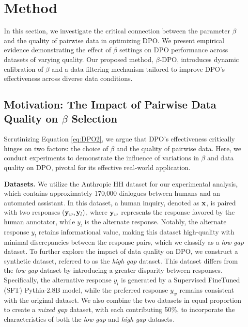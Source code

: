 
\section{Method}
\label{our_work}
In this section, we investigate the critical connection between the parameter $\beta$ and the quality of pairwise data in optimizing DPO. We present empirical evidence demonstrating the effect of $\beta$ settings on DPO performance across datasets of varying quality. Our proposed method, $\beta$-DPO, introduces dynamic calibration of $\beta$ and a data filtering mechanism tailored to improve DPO's effectiveness across diverse data conditions.
\subsection{Motivation: The Impact of Pairwise Data Quality on $\beta$ Selection}
\label{motivation_sec}
Scrutinizing Equation \eqref{eq:DPO2}, we argue that DPO's effectiveness critically hinges on two factors: the choice of $\beta$ and the quality of pairwise data. Here, we conduct experiments to demonstrate the influence of variations in $\beta$ and data quality on DPO, pivotal for its effective real-world application.

\textbf{Datasets.} 
We utilize the Anthropic HH dataset \cite{Bai2022training} for our experimental analysis, which contains approximately 170,000 dialogues between humans and an automated assistant. In this dataset, a human inquiry, denoted as $\mathbf{x}$, is paired with two responses $(\mathbf{y}_w, \mathbf{y}_l)$, where $\mathbf{y}_w$ represents the response favored by the human annotator, while $y_l$ is the alternate response. Notably, the alternate response $y_l$ retains informational value, making this dataset high-quality with minimal discrepancies between the response pairs, which we classify as a \emph{low gap} dataset.
To further explore the impact of data quality on DPO, we construct a synthetic dataset, referred to as the \emph{high gap} dataset. This dataset differs from the \emph{low gap} dataset by introducing a greater disparity between responses. Specifically, the alternative response $y_l$ is generated by a Supervised FineTuned (SFT) Pythia-2.8B model, while the preferred response $y_w$ remains consistent with the original dataset.
We also combine the two datasets in equal proportion to create a \emph{mixed gap} dataset, with each contributing 50\%, to incorporate the characteristics of both the \emph{low gap} and \emph{high gap} datasets.

